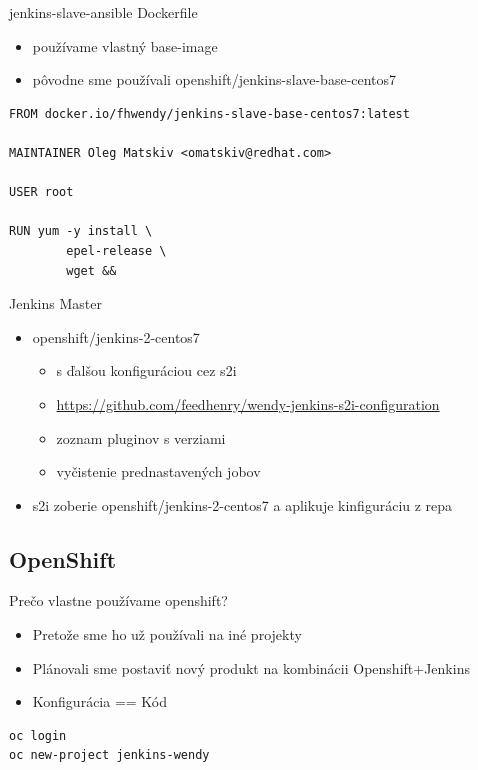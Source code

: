 \documentclass[bigger]{beamer}
\begin{document}
\begin{frame}[fragile,label={sec:org2a415c3}]{jenkins-slave-ansible Dockerfile}
 \begin{itemize}
\item používame vlastný base-image
\item pôvodne sme používali openshift/jenkins-slave-base-centos7
\end{itemize}
\begin{verbatim}
FROM docker.io/fhwendy/jenkins-slave-base-centos7:latest

MAINTAINER Oleg Matskiv <omatskiv@redhat.com>

USER root

RUN yum -y install \
        epel-release \
        wget && 
\end{verbatim}
\end{frame}

\begin{frame}[label={sec:org800bcc1}]{Jenkins Master}
\begin{itemize}
\item openshift/jenkins-2-centos7
\begin{itemize}
\item s ďalšou konfiguráciou cez s2i
\item \url{https://github.com/feedhenry/wendy-jenkins-s2i-configuration}
\item zoznam pluginov s verziami
\item vyčistenie prednastavených jobov
\end{itemize}
\item s2i zoberie openshift/jenkins-2-centos7 a aplikuje kinfiguráciu z repa
\end{itemize}
\end{frame}

\subsection{OpenShift}
\label{sec:orgf50299f}
\begin{frame}[fragile,label={sec:org4ad0fab}]{Prečo vlastne používame openshift?}
 \begin{itemize}
\item Pretože sme ho už používali na iné projekty
\item Plánovali sme postaviť nový produkt na kombinácii Openshift+Jenkins
\item Konfigurácia == Kód
\end{itemize}

\begin{verbatim}
oc login
oc new-project jenkins-wendy
\end{verbatim}
\end{frame}
\end{document}
